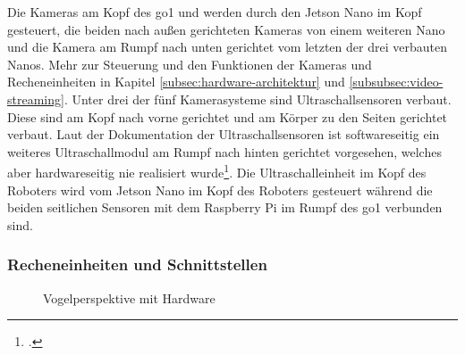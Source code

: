 Die Kameras am Kopf des \gls{go1}  und  werden durch den Jetson Nano im Kopf gesteuert, die beiden
nach außen gerichteten Kameras  von einem weiteren Nano und die Kamera am Rumpf nach unten gerichtet 
vom letzten der drei verbauten Nanos.
Mehr zur Steuerung und den Funktionen der Kameras und Recheneinheiten in Kapitel \ref{subsec:hardware-architektur} und
\ref{subsubsec:video-streaming}.
Unter drei der fünf Kamerasysteme sind Ultraschallsensoren verbaut.
Diese sind am Kopf nach vorne gerichtet  und am Körper zu den Seiten gerichtet  verbaut.
Laut der Dokumentation der Ultraschallsensoren ist softwareseitig ein weiteres Ultraschallmodul am Rumpf nach hinten
gerichtet  vorgesehen, welches aber hardwareseitig nie realisiert wurde\footcite{go1_ultraschall_anleitung}.
Die Ultraschalleinheit im Kopf des Roboters wird vom Jetson Nano im Kopf des Roboters gesteuert während die beiden seitlichen
Sensoren mit dem Raspberry Pi im Rumpf des \gls{go1} verbunden sind.




\subsubsection{Recheneinheiten und Schnittstellen}

\begin{figure}[h]
    \caption{Vogelperspektive mit Hardware}\label{fig:hardware}
\end{figure}
